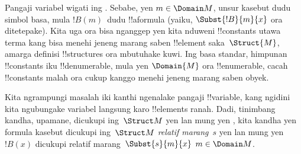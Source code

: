 \documentclass[../../../include/open-logic-section]{subfiles}
\begin{document}
\begin{explain}
Pangaji variabel wigati ing
.
 Sebabe, yen $m \in \Domain M$,
unsur kasebut dudu simbol basa, mula $!B(m)$~dudu !!a{formula}
(yaiku, $\Subst{!B}{m}{x}$ ora ditetepake). Kita uga ora bisa
nganggep yen kita nduweni !!{constant}s utawa terma kang bisa menehi
jeneng marang saben !!{element} saka~$\Struct{M}$, amarga definisi
!!{structure}s ora mbutuhake kuwi. Ing basa standar, himpunan
!!{constant}s iku !!{denumerable}, mula yen $\Domain{M}$
ora !!{enumerable}, cacah !!{constant}s malah ora cukup kanggo
menehi jeneng marang saben obyek.

Kita ngrampungi masalah iki kanthi ngenalake pangaji !!{variable},
kang ngidini kita ngubungake variabel langsung karo !!{element}s
ranah. Dadi, tinimbang kandha, upamane,
dicukupi ing~$\Struct M$ yen lan mung yen
, kita kandha yen formula kasebut dicukupi
ing~$\Struct M$ \emph{relatif marang}~$s$ yen lan mung yen
$!B(x)$ dicukupi relatif marang~$\Subst{s}{m}{x}$
$m \in \Domain M$.
\end{explain}
\end{document}
